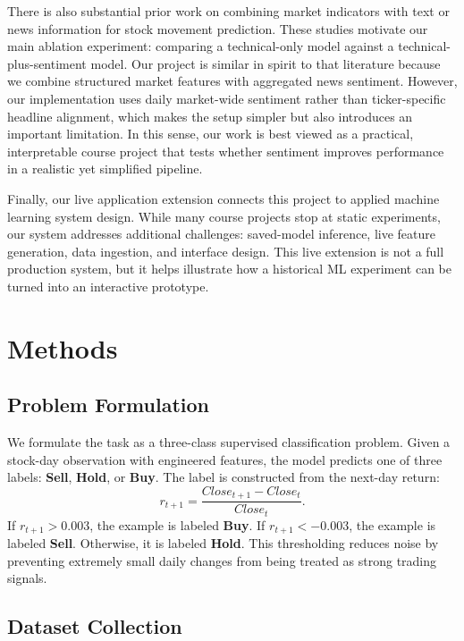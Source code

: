 \documentclass[11pt]{article}
\begin{document}
There is also substantial prior work on combining market indicators with text or news information for stock movement prediction. These studies motivate our main ablation experiment: comparing a technical-only model against a technical-plus-sentiment model. Our project is similar in spirit to that literature because we combine structured market features with aggregated news sentiment. However, our implementation uses daily market-wide sentiment rather than ticker-specific headline alignment, which makes the setup simpler but also introduces an important limitation. In this sense, our work is best viewed as a practical, interpretable course project that tests whether sentiment improves performance in a realistic yet simplified pipeline.

Finally, our live application extension connects this project to applied machine learning system design. While many course projects stop at static experiments, our system addresses additional challenges: saved-model inference, live feature generation, data ingestion, and interface design. This live extension is not a full production system, but it helps illustrate how a historical ML experiment can be turned into an interactive prototype.

\section{Methods}

\subsection{Problem Formulation}

We formulate the task as a three-class supervised classification problem. Given a stock-day observation with engineered features, the model predicts one of three labels: \textbf{Sell}, \textbf{Hold}, or \textbf{Buy}. The label is constructed from the next-day return:
\[
r_{t+1} = \frac{Close_{t+1} - Close_t}{Close_t}.
\]
If $r_{t+1} > 0.003$, the example is labeled \textbf{Buy}. If $r_{t+1} < -0.003$, the example is labeled \textbf{Sell}. Otherwise, it is labeled \textbf{Hold}. This thresholding reduces noise by preventing extremely small daily changes from being treated as strong trading signals.

\subsection{Dataset Collection}
\end{document}
